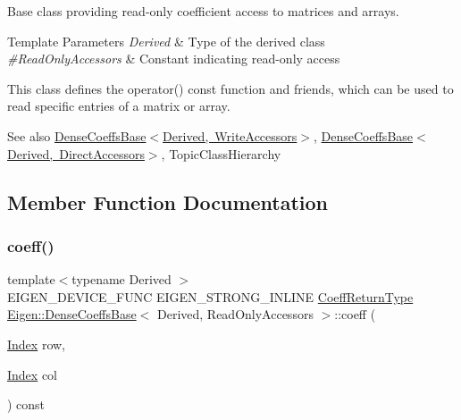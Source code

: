 Base class providing read-\/only coefficient access to matrices and arrays. 


\begin{DoxyTemplParams}{Template Parameters}
{\em Derived} & Type of the derived class \\
\hline
{\em \#\+Read\+Only\+Accessors} & Constant indicating read-\/only access\\
\hline
\end{DoxyTemplParams}
This class defines the {\ttfamily operator()} {\ttfamily const} function and friends, which can be used to read specific entries of a matrix or array.

\begin{DoxySeeAlso}{See also}
\mbox{\hyperlink{class_eigen_1_1_dense_coeffs_base_3_01_derived_00_01_write_accessors_01_4}{Dense\+Coeffs\+Base$<$\+Derived, Write\+Accessors$>$}}, \mbox{\hyperlink{class_eigen_1_1_dense_coeffs_base_3_01_derived_00_01_direct_accessors_01_4}{Dense\+Coeffs\+Base$<$\+Derived, Direct\+Accessors$>$}}, Topic\+Class\+Hierarchy 
\end{DoxySeeAlso}


\subsection{Member Function Documentation}
\mbox{\label{class_eigen_1_1_dense_coeffs_base_3_01_derived_00_01_read_only_accessors_01_4_ad41647ef695f9a5a58a9a0f50e2ae064}} 
\subsubsection{\texorpdfstring{coeff()}{coeff()}\hspace{0.1cm}{\footnotesize\ttfamily [1/2]}}
{\footnotesize\ttfamily template$<$typename Derived $>$ \\
E\+I\+G\+E\+N\+\_\+\+D\+E\+V\+I\+C\+E\+\_\+\+F\+U\+NC E\+I\+G\+E\+N\+\_\+\+S\+T\+R\+O\+N\+G\+\_\+\+I\+N\+L\+I\+NE \mbox{\hyperlink{struct_eigen_1_1internal_1_1true__type}{Coeff\+Return\+Type}} \mbox{\hyperlink{class_eigen_1_1_dense_coeffs_base}{Eigen\+::\+Dense\+Coeffs\+Base}}$<$ Derived, Read\+Only\+Accessors $>$\+::coeff (\begin{DoxyParamCaption}\item[{\mbox{\hyperlink{struct_eigen_1_1_eigen_base_a554f30542cc2316add4b1ea0a492ff02}{Index}}}]{row,  }\item[{\mbox{\hyperlink{struct_eigen_1_1_eigen_base_a554f30542cc2316add4b1ea0a492ff02}{Index}}}]{col }\end{DoxyParamCaption}) const\hspace{0.3cm}{\ttfamily [inline]}}

